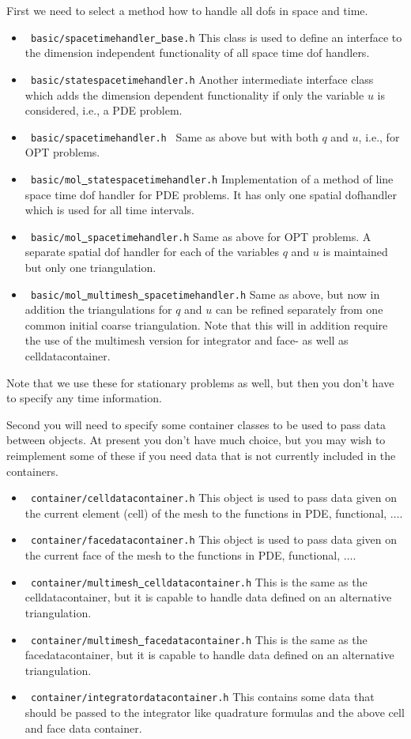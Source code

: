 First we need to select a method how to handle all dofs in space and time.
\begin{itemize}
\item \texttt{ basic/spacetimehandler\underline{ }base.h} This class is used to define 
  an interface to the dimension independent functionality of all space time dof handlers. 
\item \texttt{ basic/statespacetimehandler.h} Another intermediate interface class which adds 
  the dimension dependent functionality if only the variable $u$ is considered, i.e., a 
  PDE problem.
\item \texttt{ basic/spacetimehandler.h } Same as above but with both $q$ and $u$, i.e., for
  OPT problems.
\item \texttt{ basic/mol\underline{ }statespacetimehandler.h} Implementation of a method of 
  line space time dof handler for PDE problems. It has only one spatial 
  dofhandler which is used for all time intervals.
\item \texttt{ basic/mol\underline{ }spacetimehandler.h} Same as above for OPT problems.
  A separate spatial dof handler for each of the variables $q$ and $u$ is maintained 
  but only one triangulation.
\item \texttt{ basic/mol\underline{ }multimesh\underline{ }spacetimehandler.h}
  Same as above, but now in addition the triangulations for $q$ and $u$ can be refined
  separately from one common initial coarse triangulation. Note that this will
  in addition require the use of the multimesh version for integrator and 
  face- as well as celldatacontainer.
\end{itemize}
Note that we use these for stationary problems as well, but then you don't have to specify
any time information.

Second you will need to specify some container classes to be used to 
pass data between objects. At present you don't have much choice, but you may wish 
to reimplement some of these if you need data that is not currently included in 
the containers.
\begin{itemize}
\item \texttt{ container/celldatacontainer.h} This object is used to pass data 
  given on the current element (cell) of the mesh to the functions in PDE, functional, 
  $\ldots$. 
\item \texttt{ container/facedatacontainer.h} This object is used to pass data 
  given on the current face of the mesh to the functions in PDE, functional, 
  $\ldots$. 
\item \texttt{ container/multimesh\underline{ }celldatacontainer.h} This is the same as the 
  celldatacontainer, but it
  is capable to handle data defined on an alternative triangulation.
\item \texttt{ container/multimesh\underline{ }facedatacontainer.h} This is the same as the
  facedatacontainer, but it
  is capable to handle data defined on an alternative triangulation.
\item \texttt{ container/integratordatacontainer.h} This contains some data that 
  should be passed to the integrator like quadrature formulas and the above cell and 
  face data container.
\end{itemize}

